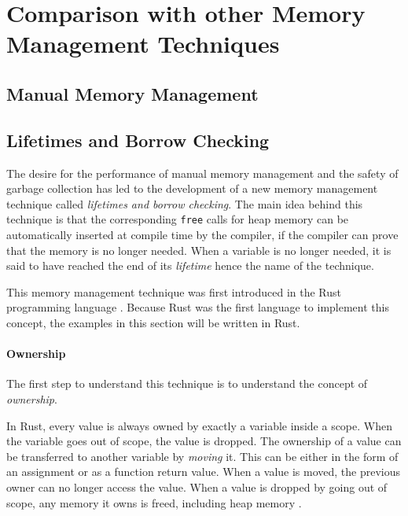 \chapter{Comparison with other Memory Management Techniques}

\section{Manual Memory Management}

\section{Lifetimes and Borrow Checking}

The desire for the performance of manual memory management and the safety of garbage collection has led to the development
of a new memory management technique called \textit{lifetimes and borrow checking}.
The main idea behind this technique is that the corresponding \texttt{free} calls for heap memory can be automatically inserted
at compile time by the compiler, if the compiler can prove that the memory is no longer needed.
When a variable is no longer needed, it is said to have reached the end of its \textit{lifetime} hence the name of the technique.

This memory management technique was first introduced in the Rust programming language \cite[1. Introduction]{rust_borrow_formalism_2021}.
Because Rust was the first language to implement this concept, the examples in this section will be written in Rust.

\subsubsection{Ownership}

The first step to understand this technique is to understand the concept of \textit{ownership}.

In Rust, every value is always owned by exactly a variable inside a scope.
When the variable goes out of scope, the value is dropped.
The ownership of a value can be transferred to another variable by \textit{moving} it.
This can be either in the form of an assignment or as a function return value.
When a value is moved, the previous owner can no longer access the value.
When a value is dropped by going out of scope, any memory it owns is freed, including heap memory \cite[59-61]{rust_book_2019}.

